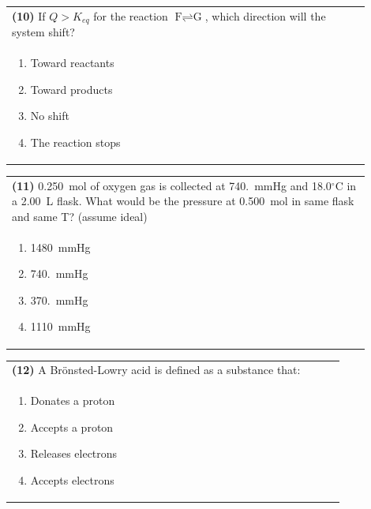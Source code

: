 \documentclass{article}
\begin{document}
\noindent\begin{tabular}{|p{0.9\linewidth}|}
\hline
\textbf{(10)} If $Q > K_{eq}$ for the reaction $\text{F} \rightleftharpoons \text{G}$, which direction will the system shift?\\[0.2cm]
\begin{minipage}[t]{0.85\linewidth}
\begin{enumerate}[label=\alph*.]
\item Toward reactants
\item Toward products
\item No shift
\item The reaction stops
\end{enumerate}
\end{minipage}\\[0.2cm]
\hline
\end{tabular}

\noindent\begin{tabular}{|p{0.9\linewidth}|}
\hline
\textbf{(11)} 0.250~mol of oxygen gas is collected at 740.~mmHg and 18.0$^\circ$C in a 2.00~L flask. What would be the pressure at 0.500~mol in same flask and same T? (assume ideal)\\[0.2cm]

\begin{minipage}[t]{0.85\linewidth}
\begin{enumerate}[label=\alph*.]
\item 1480~mmHg
\item 740.~mmHg
\item 370.~mmHg
\item 1110~mmHg
\end{enumerate}
\end{minipage}\\[0.2cm]
\hline
\end{tabular}

\noindent\begin{tabular}{|p{0.9\linewidth}|}
\hline
\textbf{(12)} A Brönsted-Lowry acid is defined as a substance that: \\[0.2cm]
\begin{minipage}[t]{0.85\linewidth}
\begin{enumerate}[label=\alph*.]
\item Donates a proton
\item Accepts a proton
\item Releases electrons
\item Accepts electrons
\end{enumerate}
\end{minipage}\\[0.2cm]
\hline
\end{tabular}
\end{document}
